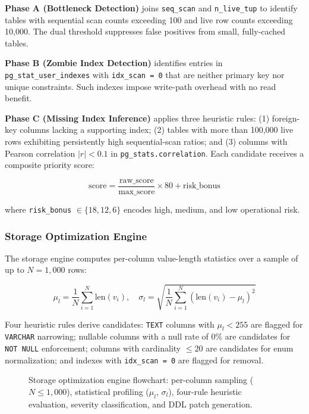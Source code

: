 \documentclass[12pt,a4paper]{report}
\begin{document}
\textbf{Phase A (Bottleneck Detection)} joins \texttt{seq\_scan} and \texttt{n\_live\_tup} to identify tables with sequential scan counts exceeding 100 and live row counts exceeding 10,000. The dual threshold suppresses false positives from small, fully-cached tables.

\textbf{Phase B (Zombie Index Detection)} identifies entries in \texttt{pg\_stat\_user\_indexes} with \texttt{idx\_scan = 0} that are neither primary key nor unique constraints. Such indexes impose write-path overhead with no read benefit.

\textbf{Phase C (Missing Index Inference)} applies three heuristic rules: (1) foreign-key columns lacking a supporting index; (2) tables with more than 100,000 live rows exhibiting persistently high sequential-scan ratios; and (3) columns with Pearson correlation $|r| < 0.1$ in \texttt{pg\_stats.correlation}. Each candidate receives a composite priority score:

\begin{equation}
    \text{score} = \frac{\text{raw\_score}}{\text{max\_score}} \times 80 + \text{risk\_bonus}
\end{equation}

where \texttt{risk\_bonus} $\in \{18, 12, 6\}$ encodes high, medium, and low operational risk.

\subsubsection{Storage Optimization Engine}

The storage engine computes per-column value-length statistics over a sample of up to $N = 1{,}000$ rows:

\begin{equation}
    \mu_l = \frac{1}{N}\sum_{i=1}^{N} \text{len}(v_i),\quad
    \sigma_l = \sqrt{\frac{1}{N}\sum_{i=1}^{N}(\text{len}(v_i)-\mu_l)^2}
\end{equation}

Four heuristic rules derive candidates: \texttt{TEXT} columns with $\mu_l < 255$ are flagged for \texttt{VARCHAR} narrowing; nullable columns with a null rate of 0\% are candidates for \texttt{NOT NULL} enforcement; columns with cardinality $\leq 20$ are candidates for enum normalization; and indexes with \texttt{idx\_scan = 0} are flagged for removal.

\begin{figure}[htbp]
    \centering
    \fbox{\rule{0pt}{5cm}\rule{\textwidth}{0pt}}
    \caption{Storage optimization engine flowchart: per-column sampling ($N \leq 1{,}000$), statistical profiling ($\mu_l$, $\sigma_l$), four-rule heuristic evaluation, severity classification, and DDL patch generation.}
    \label{fig:optimization}
\end{figure}
\end{document}
